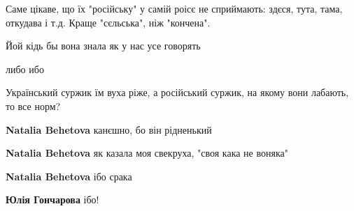 Саме цікаве, що їх "російську" у самій роісє не сприймають: здєся, тута, тама, откудава і т.д. Краще "сєльська", ніж "кончена".

 
Йой кідь бы вона знала як у нас усе говорять

 
либо ибо

 
Український суржик їм вуха ріже, а російський суржик, на якому вони лабають, то все норм?

\begin{itemize}
 
\textbf{Natalia Behetova} канєшно, бо він рідненький

 
\textbf{Natalia Behetova} як казала моя свекруха, "своя кака не воняка"

 
\textbf{Natalia Behetova} ібо срака

 
\textbf{Юлія Гончарова} ібо!
\end{itemize}

